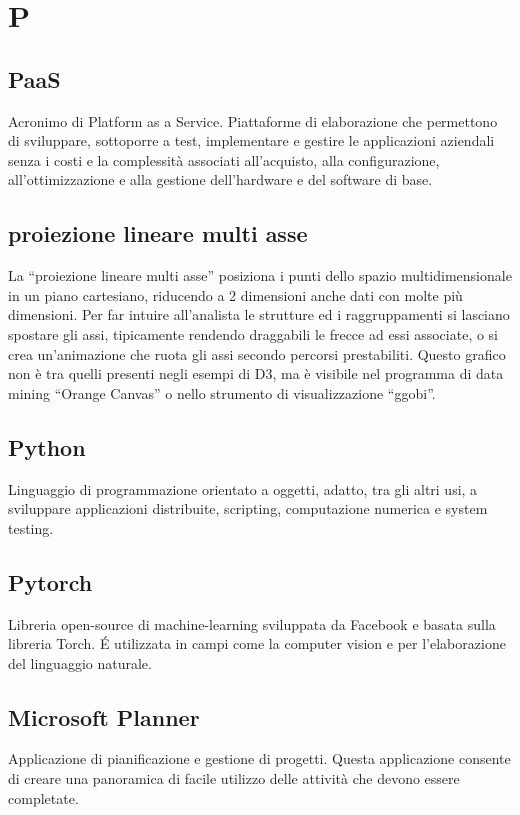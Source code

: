 \section*{P}
\markright{}
\subsection*{PaaS}
Acronimo di Platform as a Service. Piattaforme di elaborazione che permettono di sviluppare, sottoporre a test, implementare e gestire le applicazioni aziendali senza i costi e la complessità associati all'acquisto, alla configurazione, all'ottimizzazione e alla gestione dell'hardware e del software di base. 
\subsection*{proiezione lineare multi asse}
La “proiezione lineare multi asse” posiziona i punti dello spazio multidimensionale in un piano cartesiano, riducendo a 2 dimensioni anche dati con molte più dimensioni. Per far intuire all’analista le strutture ed i raggruppamenti si lasciano spostare gli assi, tipicamente rendendo draggabili le frecce ad essi associate, o si crea un’animazione che ruota gli assi secondo percorsi prestabiliti. Questo grafico non è tra quelli presenti negli esempi di D3, ma è visibile nel programma di data mining “Orange Canvas” o nello strumento di visualizzazione “ggobi”.
\subsection*{Python}
Linguaggio di programmazione orientato a oggetti, adatto, tra gli altri usi, a sviluppare applicazioni distribuite, scripting, computazione numerica e system testing.
\subsection*{Pytorch}
Libreria open-source di machine-learning sviluppata da Facebook e basata sulla libreria Torch. \'E utilizzata in campi come la computer vision e per l'elaborazione del linguaggio naturale.

\subsection*{Microsoft Planner}
Applicazione di pianificazione e gestione di progetti. Questa applicazione consente di creare una panoramica di facile utilizzo delle attività che devono essere completate.